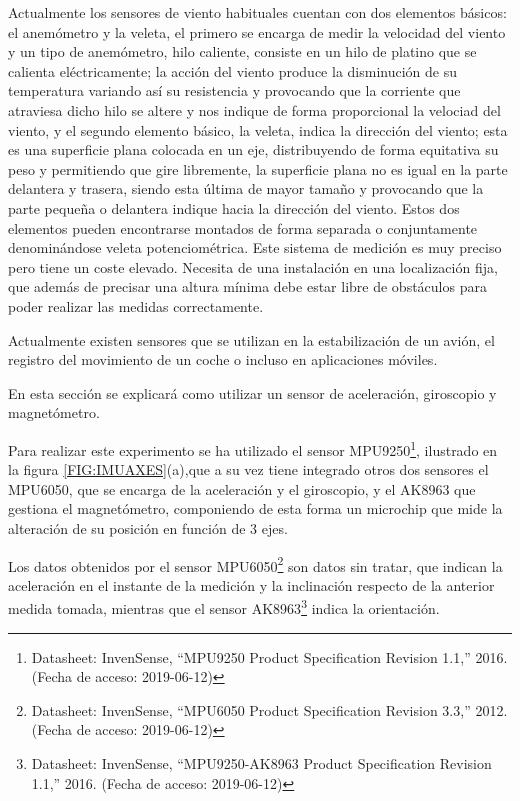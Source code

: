 
 Actualmente los sensores de viento habituales cuentan con dos elementos básicos: el anemómetro y la veleta, el primero se encarga de medir la velocidad del viento y un tipo de anemómetro, hilo caliente, consiste en un hilo de platino que se calienta eléctricamente; la acción del viento produce la disminución de su temperatura variando así su resistencia y provocando que la corriente que atraviesa dicho hilo se altere y nos indique de forma proporcional la velociad del viento\cite{Tropea1995}, y el segundo elemento básico, la veleta, indica la dirección del viento; esta es una superficie plana colocada en un eje, distribuyendo de forma equitativa su peso y permitiendo que gire libremente, la superficie plana no es igual en la parte delantera y trasera, siendo esta última de mayor tamaño y  provocando que la parte pequeña o delantera indique hacia la dirección del viento\cite{Noble2019}. Estos dos elementos pueden encontrarse montados de forma separada o conjuntamente denominándose veleta potenciométrica\cite{Mur2012}.
 Este sistema de medición es muy preciso pero tiene un coste elevado. Necesita de una instalación en una localización fija, que además de precisar una altura mínima debe estar libre de obstáculos para poder realizar las medidas correctamente.
 
 Actualmente existen sensores que se utilizan en la estabilización de un avión, el registro del movimiento de un coche o incluso en aplicaciones móviles.
 
 En esta sección se explicará como utilizar un sensor de aceleración, giroscopio y magnetómetro.
 
 Para realizar este experimento se ha utilizado el sensor MPU9250\footnote{Datasheet: InvenSense, ``{MPU9250 Product Specification Revision 1.1},'' 2016. (Fecha de acceso: 2019-06-12)}, ilustrado en la figura \ref{FIG:IMUAXES}(a),que a su vez tiene integrado otros dos sensores el MPU6050, que se encarga de la aceleración y el giroscopio, y el AK8963 que gestiona el magnetómetro, componiendo de esta forma un microchip que mide la alteración de su posición en función de 3 ejes.
 
 Los datos obtenidos por el sensor MPU6050\footnote{Datasheet: InvenSense, ``{MPU6050 Product Specification Revision 3.3},'' 2012. (Fecha de acceso: 2019-06-12)} son datos sin tratar, que indican la aceleración en el instante de la medición y la inclinación respecto de la anterior medida tomada, mientras que el sensor AK8963\footnote{Datasheet: InvenSense, ``{MPU9250-AK8963 Product Specification Revision 1.1},'' 2016. (Fecha de acceso: 2019-06-12)} indica la orientación.

